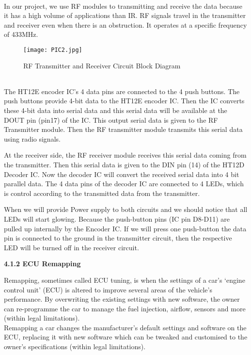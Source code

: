 \documentclass[a4paper,12pt, English]{article}
\begin{document}
\begin{normalsize}
\\
In our project, we use RF modules to transmitting and receive the data because it has a high volume of applications than IR. RF signals travel in the transmitter and receiver even when there is an obstruction. It operates at a specific frequency of 433MHz.
\begin{figure}[htb]
\begin{center}
\texttt{[image: PIC2.jpg]}
\end{center}
\begin{center}
\renewcommand{\thefigure}{4.1.2}
\caption{\footnotesize RF Transmitter and Receiver Circuit Block Diagram}
\end{center}
\end{figure}\\
\newline
The HT12E encoder IC’s 4 data pins are connected to the 4 push buttons. The push buttons provide 4-bit data to the HT12E encoder IC. Then the IC converts these 4-bit data into serial data and this serial data will be available at the DOUT pin (pin17) of the IC. This output serial data is given to the RF Transmitter module. Then the RF transmitter module transmits this serial data using radio signals.

At the receiver side, the RF receiver module receives this serial data coming from the transmitter. Then this serial data is given to the DIN pin (14) of the HT12D Decoder IC. Now the decoder IC will convert the received serial data into 4 bit parallel data. The 4 data pins of the decoder IC are connected to 4 LEDs, which is control according to the transmitted data from the transmitter.

When we will provide Power supply to both circuits and we should notice that all LEDs will start glowing. Because the push-button pins (IC pin D8-D11) are pulled up internally by the Encoder IC. If we will press one push-button the data pin is connected to the ground in the transmitter circuit, then the respective LED will be turned off in the receiver circuit.\\
\newline
\begin{large}
\textbf{4.1.2 ECU Remapping}
\end{large}
\newline
Remapping, sometimes called ECU tuning, is when the settings of a car’s ‘engine control unit’ (ECU) is altered to improve several areas of the vehicle’s performance. By overwriting the existing settings with new software, the owner can re-programme the car to manage the fuel injection, airflow, sensors and more (within legal limitations).\\
Remapping a car changes the manufacturer’s default settings and software on the ECU, replacing it with new software which can be tweaked and customised to the owner’s specifications (within legal limitations).


\end{normalsize}
\end{document}
